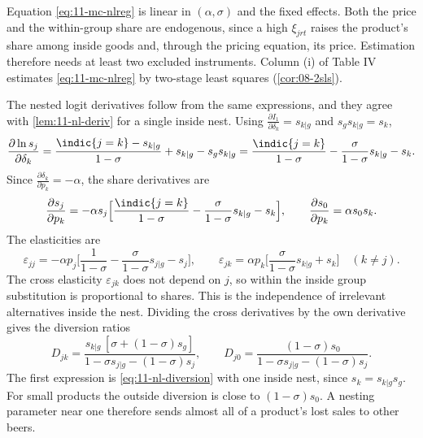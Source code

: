 Equation \eqref{eq:11-mc-nlreg} is linear in $(\alpha, \sigma)$ and the fixed effects. Both the price and the
within-group share are endogenous, since a high $\xi_{jrt}$ raises the product's share among inside goods and, through
the pricing equation, its price. Estimation therefore needs at least two excluded instruments. Column (i) of Table IV
estimates \eqref{eq:11-mc-nlreg} by two-stage least squares (\cref{cor:08-2sls}).

The nested logit derivatives follow from the same expressions, and they agree with \cref{lem:11-nl-deriv} for a
single inside nest. Using $\frac{\partial I_1}{\partial \delta_k} = s_{k|g}$ and $s_g s_{k|g} = s_k$,
\begin{equation*}
  \frac{\partial \ln s_j}{\partial \delta_k} = \frac{\indic\{j=k\} - s_{k|g}}{1-\sigma} + s_{k|g} - s_g s_{k|g}
  = \frac{\indic\{j=k\}}{1-\sigma} - \frac{\sigma}{1-\sigma}s_{k|g} - s_k .
\end{equation*}
Since $\frac{\partial\delta_k}{\partial p_k} = -\alpha$, the share derivatives are
\begin{equation}\label{eq:11-mc-nlderiv}
  \frac{\partial s_j}{\partial p_k} = -\alpha s_j\Big[\frac{\indic\{j=k\}}{1-\sigma} - \frac{\sigma}{1-\sigma}s_{k|g}
  - s_k\Big], \qquad \frac{\partial s_0}{\partial p_k} = \alpha s_0 s_k .
\end{equation}
The elasticities are
\begin{equation}\label{eq:11-mc-nlelast}
  \varepsilon_{jj} = -\alpha p_j\Big[\frac{1}{1-\sigma} - \frac{\sigma}{1-\sigma}s_{j|g} - s_j\Big], \qquad
  \varepsilon_{jk} = \alpha p_k\Big[\frac{\sigma}{1-\sigma}s_{k|g} + s_k\Big] \quad (k \neq j).
\end{equation}
The cross elasticity $\varepsilon_{jk}$ does not depend on $j$, so within the inside group substitution is
proportional to shares. This is the independence of irrelevant alternatives inside the nest. Dividing the cross
derivatives by the own derivative gives the diversion ratios
\begin{equation}\label{eq:11-mc-nldiv}
  D_{jk} = \frac{s_{k|g}\,[\sigma + (1-\sigma)s_g]}{1 - \sigma s_{j|g} - (1-\sigma)s_j}, \qquad
  D_{j0} = \frac{(1-\sigma)s_0}{1 - \sigma s_{j|g} - (1-\sigma)s_j}.
\end{equation}
The first expression is \eqref{eq:11-nl-diversion} with one inside nest, since $s_k = s_{k|g}s_g$. For small
products the outside diversion is close to $(1-\sigma)s_0$. A nesting parameter near one therefore sends
almost all of a product's lost sales to other beers.

